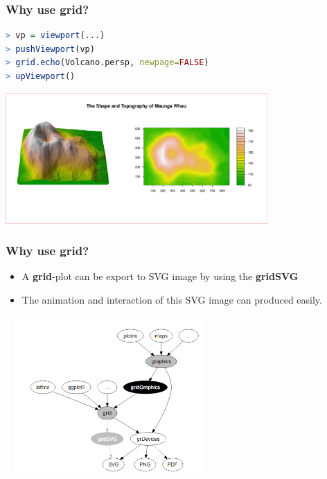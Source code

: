\documentclass{beamer}
\begin{document}
\begin{frame}[fragile]
\frametitle{Why use \textbf{grid}?}

\begin{lstlisting}[language = R]
> vp = viewport(...)
> pushViewport(vp)
> grid.echo(Volcano.persp, newpage=FALSE)
> upViewport()
\end{lstlisting}

\begin{center}
  \includegraphics[height = 5cm, width = 10cm]{plot/demo_grid_example_3.pdf}
\end{center}

\end{frame}


\begin{frame}[fragile]
\frametitle{Why use \textbf{grid}?}
\begin{itemize}
  \item A \textbf{grid}-plot can be export to SVG image by using the \textbf{gridSVG}
  \item The animation and interaction of this SVG image can produced easily.
\end{itemize}

\begin{center}
\includegraphics[width = 8cm, height = 6cm]{plot/grid_graphics.png}
\end{center}
\end{frame}
\end{document}

